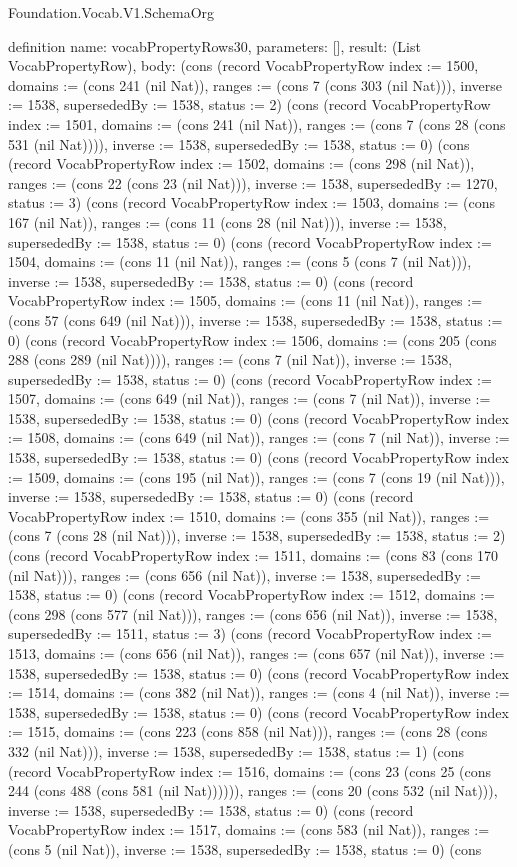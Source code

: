 \begin{lexlean}{Foundation.Vocab.V1.SchemaOrg}
\begin{semanticmodule}
definition{
  name: vocabPropertyRows30,
  parameters: [],
  result: (List VocabPropertyRow),
  body: (cons (record VocabPropertyRow {index := 1500, domains := (cons 241 (nil Nat)), ranges := (cons 7 (cons 303 (nil Nat))), inverse := 1538, supersededBy := 1538, status := 2}) (cons (record VocabPropertyRow {index := 1501, domains := (cons 241 (nil Nat)), ranges := (cons 7 (cons 28 (cons 531 (nil Nat)))), inverse := 1538, supersededBy := 1538, status := 0}) (cons (record VocabPropertyRow {index := 1502, domains := (cons 298 (nil Nat)), ranges := (cons 22 (cons 23 (nil Nat))), inverse := 1538, supersededBy := 1270, status := 3}) (cons (record VocabPropertyRow {index := 1503, domains := (cons 167 (nil Nat)), ranges := (cons 11 (cons 28 (nil Nat))), inverse := 1538, supersededBy := 1538, status := 0}) (cons (record VocabPropertyRow {index := 1504, domains := (cons 11 (nil Nat)), ranges := (cons 5 (cons 7 (nil Nat))), inverse := 1538, supersededBy := 1538, status := 0}) (cons (record VocabPropertyRow {index := 1505, domains := (cons 11 (nil Nat)), ranges := (cons 57 (cons 649 (nil Nat))), inverse := 1538, supersededBy := 1538, status := 0}) (cons (record VocabPropertyRow {index := 1506, domains := (cons 205 (cons 288 (cons 289 (nil Nat)))), ranges := (cons 7 (nil Nat)), inverse := 1538, supersededBy := 1538, status := 0}) (cons (record VocabPropertyRow {index := 1507, domains := (cons 649 (nil Nat)), ranges := (cons 7 (nil Nat)), inverse := 1538, supersededBy := 1538, status := 0}) (cons (record VocabPropertyRow {index := 1508, domains := (cons 649 (nil Nat)), ranges := (cons 7 (nil Nat)), inverse := 1538, supersededBy := 1538, status := 0}) (cons (record VocabPropertyRow {index := 1509, domains := (cons 195 (nil Nat)), ranges := (cons 7 (cons 19 (nil Nat))), inverse := 1538, supersededBy := 1538, status := 0}) (cons (record VocabPropertyRow {index := 1510, domains := (cons 355 (nil Nat)), ranges := (cons 7 (cons 28 (nil Nat))), inverse := 1538, supersededBy := 1538, status := 2}) (cons (record VocabPropertyRow {index := 1511, domains := (cons 83 (cons 170 (nil Nat))), ranges := (cons 656 (nil Nat)), inverse := 1538, supersededBy := 1538, status := 0}) (cons (record VocabPropertyRow {index := 1512, domains := (cons 298 (cons 577 (nil Nat))), ranges := (cons 656 (nil Nat)), inverse := 1538, supersededBy := 1511, status := 3}) (cons (record VocabPropertyRow {index := 1513, domains := (cons 656 (nil Nat)), ranges := (cons 657 (nil Nat)), inverse := 1538, supersededBy := 1538, status := 0}) (cons (record VocabPropertyRow {index := 1514, domains := (cons 382 (nil Nat)), ranges := (cons 4 (nil Nat)), inverse := 1538, supersededBy := 1538, status := 0}) (cons (record VocabPropertyRow {index := 1515, domains := (cons 223 (cons 858 (nil Nat))), ranges := (cons 28 (cons 332 (nil Nat))), inverse := 1538, supersededBy := 1538, status := 1}) (cons (record VocabPropertyRow {index := 1516, domains := (cons 23 (cons 25 (cons 244 (cons 488 (cons 581 (nil Nat)))))), ranges := (cons 20 (cons 532 (nil Nat))), inverse := 1538, supersededBy := 1538, status := 0}) (cons (record VocabPropertyRow {index := 1517, domains := (cons 583 (nil Nat)), ranges := (cons 5 (nil Nat)), inverse := 1538, supersededBy := 1538, status := 0}) (cons }
\end{semanticmodule}
\end{lexlean}

